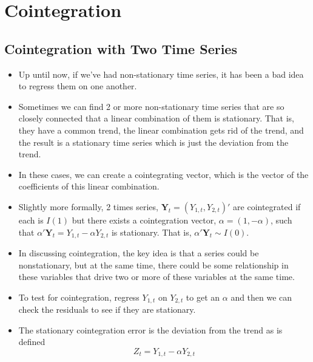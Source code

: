 \documentclass[11pt]{article}
\begin{document}
\section{Cointegration}
\subsection{Cointegration with Two Time Series}
\begin{itemize}
    \item Up until now, if we've had non-stationary time series, it has been a bad idea to 
    regress them on one another. 
    \item Sometimes we can find 2 or more non-stationary time series that are so closely 
    connected that a linear combination of them is stationary. That is, they have a common 
    trend, the linear combination gets rid of the trend, and the result is a stationary time 
    series which is just the deviation from the trend. 
    \item In these cases, we can create a cointegrating vector, which is the vector of the 
    coefficients of this linear combination. 
    \item Slightly more formally, 2 times series, $ \boldsymbol{Y}_t = (Y_{1,t}, Y_{2,t})'$ 
    are cointegrated if each is $I(1)$ but there exists a cointegration vector, $\alpha = 
    (1, -\alpha)$, such that $ \alpha'\boldsymbol{Y}_t = Y_{1,t} - \alpha Y_{2,t}$ is 
    stationary. That is, $\alpha'\boldsymbol{Y}_t \sim I(0)$.
    \item In discussing cointegration, the key idea is that a series could be nonstationary, 
    but at the same time, there could be some relationship in these variables that drive two or 
    more of these variables at the same time. 
    \item To test for cointegration, regress $Y_{1,t}$ on $Y_{2,t}$ to get an $\alpha$ and then 
    we can check the residuals to see if they are stationary. %
    \item The stationary cointegration error is the deviation from the trend as is defined 
    \[Z_t =  Y_{1,t} - \alpha Y_{2,t} \]
\end{itemize}
\end{document}
